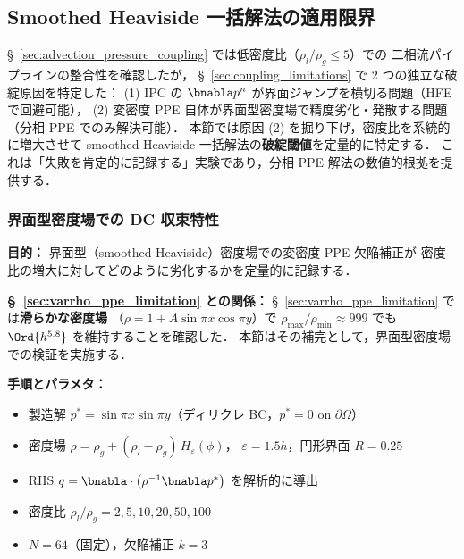 %
\subsection{Smoothed Heaviside 一括解法の適用限界}
\label{sec:interface_crossing}

§~\ref{sec:advection_pressure_coupling} では低密度比（$\rho_l/\rho_g \leq 5$）での
二相流パイプラインの整合性を確認したが，
§~\ref{sec:coupling_limitations} で 2 つの独立な破綻原因を特定した：
(1) IPC の $\bnabla p^n$ が界面ジャンプを横切る問題（HFE で回避可能），
(2) 変密度 PPE 自体が界面型密度場で精度劣化・発散する問題（分相 PPE でのみ解決可能）．
本節では原因 (2) を掘り下げ，密度比を系統的に増大させて
smoothed Heaviside 一括解法の\textbf{破綻閾値}を定量的に特定する．
これは「失敗を肯定的に記録する」実験であり，分相 PPE 解法の数値的根拠を提供する．

\subsubsection{界面型密度場での DC 収束特性}
\label{sec:varrho_dc_convergence}

\noindent\textbf{目的：}
界面型（smoothed Heaviside）密度場での変密度 PPE 欠陥補正が
密度比の増大に対してどのように劣化するかを定量的に記録する．

\noindent\textbf{§~\ref{sec:varrho_ppe_limitation} との関係：}
§~\ref{sec:varrho_ppe_limitation} では\textbf{滑らかな密度場}
（$\rho = 1 + A\sin\pi x\cos\pi y$）で $\rho_{\max}/\rho_{\min} \approx 999$ でも
$\Ord{h^{5.8}}$ を維持することを確認した．
本節はその補完として，界面型密度場での検証を実施する．

\noindent\textbf{手順とパラメタ：}
\begin{itemize}[noitemsep]
  \item 製造解 $p^* = \sin\pi x\sin\pi y$（ディリクレ BC，$p^* = 0$ on $\partial\Omega$）
  \item 密度場 $\rho = \rho_g + (\rho_l - \rho_g)\,H_\varepsilon(\phi)$，
        $\varepsilon = 1.5h$，円形界面 $R = 0.25$
  \item RHS $q = \bnabla\cdot\bigl(\rho^{-1}\bnabla p^*\bigr)$ を解析的に導出
  \item 密度比 $\rho_l/\rho_g = 2, 5, 10, 20, 50, 100$
  \item $N = 64$（固定），欠陥補正 $k = 3$
\end{itemize}

